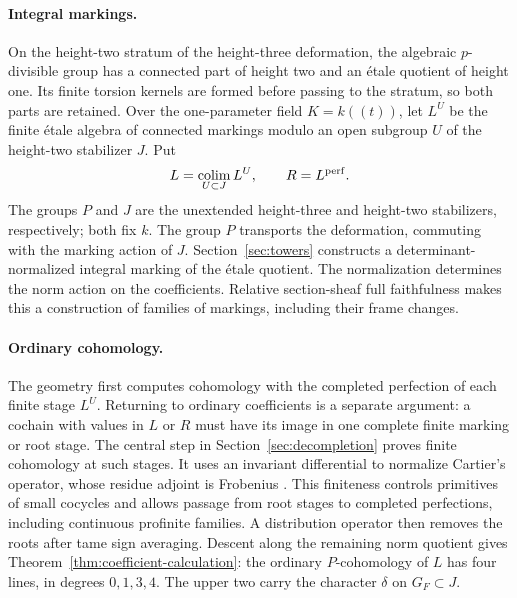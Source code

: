 \paragraph{Integral markings.}
On the height-two stratum of the height-three deformation, the algebraic
\(p\)-divisible group has a connected part of height two and an
\'etale quotient of height one. Its finite torsion kernels are formed
before passing to the stratum, so both parts are retained. Over the
one-parameter field \(K=k((t))\), let \(L^U\) be the finite \'etale
algebra of connected markings modulo an open subgroup \(U\) of the
height-two stabilizer \(J\). Put
\[
 L=\operatorname*{colim}_{U\subset J}L^U,\qquad R=L^{\mathrm{perf}}.
\]
The groups \(P\) and \(J\) are the unextended height-three and height-two
stabilizers, respectively; both fix \(k\). The group \(P\) transports the
deformation, commuting with the marking action of \(J\). Section~\ref{sec:towers}
constructs a determinant-normalized integral marking of the \'etale
quotient. The normalization determines the norm action on the coefficients.
Relative section-sheaf full faithfulness
\citep[Corollary~3.11]{ALB25} makes this a construction of families of
markings, including their frame changes.

\paragraph{Ordinary cohomology.}
The geometry first computes cohomology with the completed perfection of
each finite stage \(L^U\). Returning to ordinary coefficients is a
separate argument: a cochain with values in \(L\) or \(R\) must have its
image in one complete finite marking or root stage. The central step in
Section~\ref{sec:decompletion} proves finite cohomology at such stages.
It uses an invariant differential to normalize Cartier's operator, whose
residue adjoint is Frobenius
\citep[Chapter~II, Section~6]{Cartier58}
\citep[Proposition~9]{Serre58Topology}. This finiteness controls primitives
of small cocycles and allows passage from root stages to completed
perfections, including continuous profinite families. A distribution
operator then removes the roots after tame sign averaging. Descent along
the remaining norm quotient gives
Theorem~\ref{thm:coefficient-calculation}: the ordinary \(P\)-cohomology
of \(L\) has four lines, in degrees \(0,1,3,4\). The upper two carry the
character \(\delta\) on \(G_F\subset J\).

